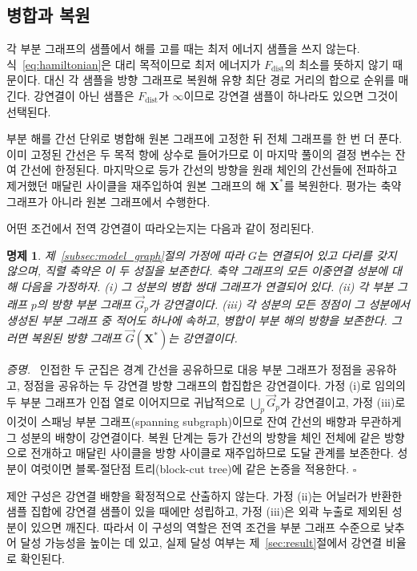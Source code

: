 \documentclass[twocolumn,a4paper]{article}
\newtheorem{proposition}[theorem]{명제}
\newenvironment{proof}{\par\noindent\textit{증명.}\ }{\hfill\(\square\)\par\medskip}
\begin{document}
\subsection{병합과 복원}

각 부분 그래프의 샘플에서 해를 고를 때는 최저 에너지 샘플을 쓰지 않는다. 식~\eqref{eq:hamiltonian}은 대리 목적이므로 최저 에너지가 \(F_{\mathrm{dist}}\)의 최소를 뜻하지 않기 때문이다. 대신 각 샘플을 방향 그래프로 복원해 유향 최단 경로 거리의 합으로 순위를 매긴다. 강연결이 아닌 샘플은 \(F_{\mathrm{dist}}\)가 \(\infty\)이므로 강연결 샘플이 하나라도 있으면 그것이 선택된다.

부분 해를 간선 단위로 병합해 원본 그래프에 고정한 뒤 전체 그래프를 한 번 더 푼다. 이미 고정된 간선은 두 목적 항에 상수로 들어가므로 이 마지막 풀이의 결정 변수는 잔여 간선에 한정된다. 마지막으로 등가 간선의 방향을 원래 체인의 간선들에 전파하고 제거했던 매달린 사이클을 재주입하여 원본 그래프의 해 \(\mathbf{X}^{*}\)를 복원한다. 평가는 축약 그래프가 아니라 원본 그래프에서 수행한다.

어떤 조건에서 전역 강연결이 따라오는지는 다음과 같이 정리된다.

\begin{proposition} \label{prop:sc}
제~\ref{subsec:model_graph}절의 가정에 따라 \(G\)는 연결되어 있고 다리를 갖지 않으며, 직렬 축약은 이 두 성질을 보존한다. 축약 그래프의 모든 이중연결 성분에 대해 다음을 가정하자. (i) 그 성분의 병합 쌍대 그래프가 연결되어 있다. (ii) 각 부분 그래프 \(p\)의 방향 부분 그래프 \(\vec{G}_p\)가 강연결이다. (iii) 각 성분의 모든 정점이 그 성분에서 생성된 부분 그래프 중 적어도 하나에 속하고, 병합이 부분 해의 방향을 보존한다. 그러면 복원된 방향 그래프 \(\vec{G}(\mathbf{X}^{*})\)는 강연결이다.
\end{proposition}

\begin{proof}
인접한 두 군집은 경계 간선을 공유하므로 대응 부분 그래프가 정점을 공유하고, 정점을 공유하는 두 강연결 방향 그래프의 합집합은 강연결이다. 가정 (i)로 임의의 두 부분 그래프가 인접 열로 이어지므로 귀납적으로 \(\bigcup_p\vec{G}_p\)가 강연결이고, 가정 (iii)로 이것이 스패닝 부분 그래프(spanning subgraph)이므로 잔여 간선의 배향과 무관하게 그 성분의 배향이 강연결이다. 복원 단계는 등가 간선의 방향을 체인 전체에 같은 방향으로 전개하고 매달린 사이클을 방향 사이클로 재주입하므로 도달 관계를 보존한다. 성분이 여럿이면 블록-절단점 트리(block-cut tree)에 같은 논증을 적용한다.
\end{proof}

제안 구성은 강연결 배향을 확정적으로 산출하지 않는다. 가정 (ii)는 어닐러가 반환한 샘플 집합에 강연결 샘플이 있을 때에만 성립하고, 가정 (iii)은 외곽 누출로 제외된 성분이 있으면 깨진다. 따라서 이 구성의 역할은 전역 조건을 부분 그래프 수준으로 낮추어 달성 가능성을 높이는 데 있고, 실제 달성 여부는 제~\ref{sec:result}절에서 강연결 비율로 확인된다.
\end{document}
